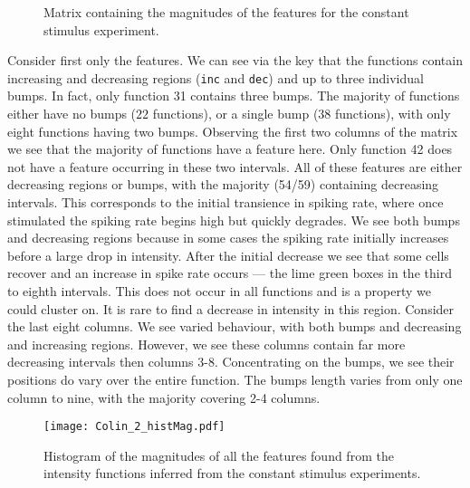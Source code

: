 \documentclass[12pt]{book} %
\begin{document}
	\begin{figure}
  \begin{center} 
    \end{center}     
    \caption{Matrix containing the magnitudes of the features for the constant stimulus experiment.}
    \label{fig:Colin2_sizes}
	\end{figure}


Consider first only the features. We can see via the key that the functions contain increasing and decreasing regions ({\tt inc} and {\tt dec}) and up to three individual bumps. In fact, only function 31 contains three bumps. The majority of functions either have no bumps ($22$ functions), or a single bump ($38$ functions), with only eight functions having two bumps. Observing the first two columns of the matrix we see that the majority of functions have a feature here. Only function 42 does not have a feature occurring in these two intervals. All of these features are either decreasing regions or bumps, with the majority (54/59) containing decreasing intervals. This corresponds to the initial transience in spiking rate, where once stimulated the spiking rate begins high but quickly degrades. We see both bumps and decreasing regions because in some cases the spiking rate initially increases before a large drop in intensity. After the initial decrease we see that some cells recover and an increase in spike rate occurs --- the lime green boxes in the third to eighth intervals. This does not occur in all functions and is a property we could cluster on. It is rare to find a decrease in intensity in this region. Consider the last eight columns. We see varied behaviour, with both bumps and decreasing and increasing regions. However, we see these columns contain far more decreasing intervals then columns 3-8. Concentrating on the bumps, we see their positions do vary over the entire function. The bumps length varies from only one column to nine, with the majority covering 2-4 columns. 

  \begin{figure}[b!]
   \hrulefill
   \begin{center} 
    {\texttt{[image: Colin\_2\_histMag.pdf]} }
    \end{center}     
    \caption{Histogram of the magnitudes of all the features found from the intensity functions inferred from the constant stimulus experiments.}
    \label{fig:Colin2_hist}
    \hrulefill
    \end{figure}
    
\end{document}
